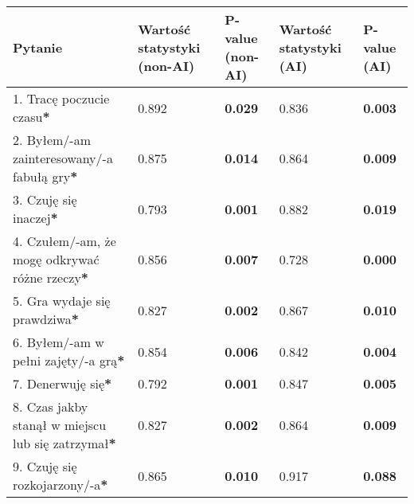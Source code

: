 \begin{table}[h!]
    \begin{center}
        \begin{tabular}{|m{10em}|m{5em}|m{5em}|m{5em}|m{5em}|}
            \hline
            Pytanie                                                                     & Wartość statystyki (non-AI) & P-value (non-AI) & Wartość statystyki (AI) & P-value (AI)   \\
            \hline
            1. Tracę poczucie czasu\textbf{*}                                           & 0.892                       & \textbf{0.029}   & 0.836                   & \textbf{0.003} \\
            2. Byłem/-am \newline zainteresowany/-a fabułą gry\textbf{*}                & 0.875                       & \textbf{0.014}   & 0.864                   & \textbf{0.009} \\
            3. Czuję się inaczej\textbf{*}                                              & 0.793                       & \textbf{0.001}   & 0.882                   & \textbf{0.019} \\
            4. Czułem/-am, że mogę odkrywać różne rzeczy\textbf{*}                      & 0.856                       & \textbf{0.007}   & 0.728                   & \textbf{0.000} \\
            5. Gra wydaje się prawdziwa\textbf{*}                                       & 0.827                       & \textbf{0.002}   & 0.867                   & \textbf{0.010} \\
            6. Byłem/-am \newline w pełni zajęty/-a grą\textbf{*}                       & 0.854                       & \textbf{0.006}   & 0.842                   & \textbf{0.004} \\
            7. Denerwuję się\textbf{*}                                                  & 0.792                       & \textbf{0.001}   & 0.847                   & \textbf{0.005} \\
            8. Czas jakby stanął w miejscu lub się zatrzymał\textbf{*}                  & 0.827                       & \textbf{0.002}   & 0.864                   & \textbf{0.009} \\
            9. Czuję się \newline rozkojarzony/-a\textbf{*}                             & 0.865                       & \textbf{0.010}   & 0.917                   & \textbf{0.088} \\

\end{tabular}
\end{center}
\end{table}
